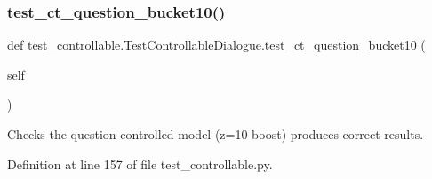 \subsubsection{\texorpdfstring{test\+\_\+ct\+\_\+question\+\_\+bucket10()}{test\_ct\_question\_bucket10()}}
{\footnotesize\ttfamily def test\+\_\+controllable.\+Test\+Controllable\+Dialogue.\+test\+\_\+ct\+\_\+question\+\_\+bucket10 (\begin{DoxyParamCaption}\item[{}]{self }\end{DoxyParamCaption})}

\begin{DoxyVerb}Checks the question-controlled model (z=10 boost) produces correct results.
\end{DoxyVerb}
 

Definition at line 157 of file test\+\_\+controllable.\+py.


